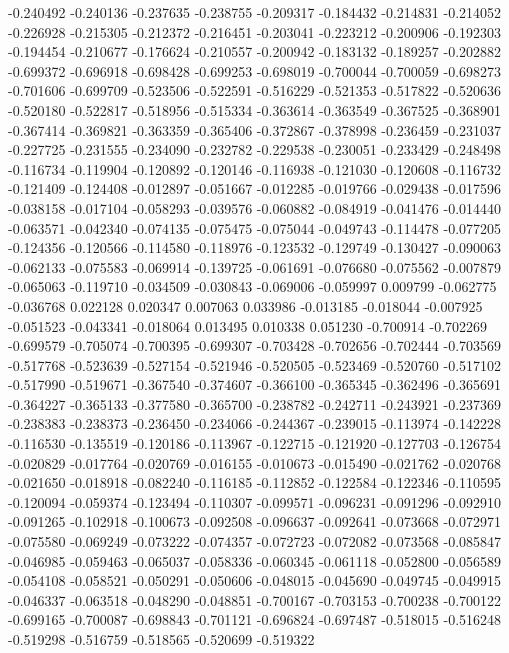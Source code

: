 -0.240492
-0.240136
-0.237635
-0.238755
-0.209317
-0.184432
-0.214831
-0.214052
-0.226928
-0.215305
-0.212372
-0.216451
-0.203041
-0.223212
-0.200906
-0.192303
-0.194454
-0.210677
-0.176624
-0.210557
-0.200942
-0.183132
-0.189257
-0.202882
-0.699372
-0.696918
-0.698428
-0.699253
-0.698019
-0.700044
-0.700059
-0.698273
-0.701606
-0.699709
-0.523506
-0.522591
-0.516229
-0.521353
-0.517822
-0.520636
-0.520180
-0.522817
-0.518956
-0.515334
-0.363614
-0.363549
-0.367525
-0.368901
-0.367414
-0.369821
-0.363359
-0.365406
-0.372867
-0.378998
-0.236459
-0.231037
-0.227725
-0.231555
-0.234090
-0.232782
-0.229538
-0.230051
-0.233429
-0.248498
-0.116734
-0.119904
-0.120892
-0.120146
-0.116938
-0.121030
-0.120608
-0.116732
-0.121409
-0.124408
-0.012897
-0.051667
-0.012285
-0.019766
-0.029438
-0.017596
-0.038158
-0.017104
-0.058293
-0.039576
-0.060882
-0.084919
-0.041476
-0.014440
-0.063571
-0.042340
-0.074135
-0.075475
-0.075044
-0.049743
-0.114478
-0.077205
-0.124356
-0.120566
-0.114580
-0.118976
-0.123532
-0.129749
-0.130427
-0.090063
-0.062133
-0.075583
-0.069914
-0.139725
-0.061691
-0.076680
-0.075562
-0.007879
-0.065063
-0.119710
-0.034509
-0.030843
-0.069006
-0.059997
0.009799
-0.062775
-0.036768
0.022128
0.020347
0.007063
0.033986
-0.013185
-0.018044
-0.007925
-0.051523
-0.043341
-0.018064
0.013495
0.010338
0.051230
-0.700914
-0.702269
-0.699579
-0.705074
-0.700395
-0.699307
-0.703428
-0.702656
-0.702444
-0.703569
-0.517768
-0.523639
-0.527154
-0.521946
-0.520505
-0.523469
-0.520760
-0.517102
-0.517990
-0.519671
-0.367540
-0.374607
-0.366100
-0.365345
-0.362496
-0.365691
-0.364227
-0.365133
-0.377580
-0.365700
-0.238782
-0.242711
-0.243921
-0.237369
-0.238383
-0.238373
-0.236450
-0.234066
-0.244367
-0.239015
-0.113974
-0.142228
-0.116530
-0.135519
-0.120186
-0.113967
-0.122715
-0.121920
-0.127703
-0.126754
-0.020829
-0.017764
-0.020769
-0.016155
-0.010673
-0.015490
-0.021762
-0.020768
-0.021650
-0.018918
-0.082240
-0.116185
-0.112852
-0.122584
-0.122346
-0.110595
-0.120094
-0.059374
-0.123494
-0.110307
-0.099571
-0.096231
-0.091296
-0.092910
-0.091265
-0.102918
-0.100673
-0.092508
-0.096637
-0.092641
-0.073668
-0.072971
-0.075580
-0.069249
-0.073222
-0.074357
-0.072723
-0.072082
-0.073568
-0.085847
-0.046985
-0.059463
-0.065037
-0.058336
-0.060345
-0.061118
-0.052800
-0.056589
-0.054108
-0.058521
-0.050291
-0.050606
-0.048015
-0.045690
-0.049745
-0.049915
-0.046337
-0.063518
-0.048290
-0.048851
-0.700167
-0.703153
-0.700238
-0.700122
-0.699165
-0.700087
-0.698843
-0.701121
-0.696824
-0.697487
-0.518015
-0.516248
-0.519298
-0.516759
-0.518565
-0.520699
-0.519322
